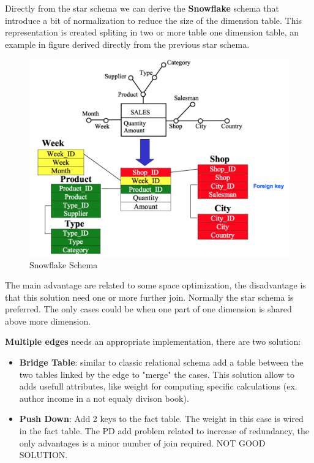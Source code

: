 \documentclass[12pt]{article}
\begin{document}
Directly from the star schema we can derive the \textbf{Snowflake} schema that introduce a bit of normalization to reduce the size of the dimension table. This representation is created spliting in two or more table one dimension table, an example in figure derived directly from the previous star schema.

\begin{figure}[h!]
  \includegraphics[width=\linewidth]{images/snowflake.png}
  \caption{Snowflake Schema}
  \label{fig:snowflake}
\end{figure}

The main advantage are related to some space optimization, the disadvantage is that this solution need one or more further join. Normally the star schema is preferred. The only cases could be when one part of one dimension is shared above more dimension.

\textbf{Multiple edges} needs an appropriate implementation, there are two solution:
\begin{itemize}
  \item \textbf{Bridge Table}: similar to classic relational schema add a table between the two tables linked by the edge to "merge" the cases. This solution allow to adds usefull attributes, like weight for computing specific calculations (ex. author income in a not equaly divison book).
  \item \textbf{Push Down}: Add 2 keys to the fact table. The weight in this case is wired in the fact table. The PD add problem related to increase of redundancy, the only advantages is a minor number of join required.  NOT GOOD SOLUTION.
\end{itemize}
\end{document}
